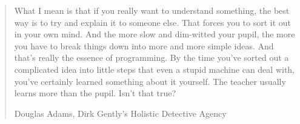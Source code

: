 \phantom{.}
\vspace{4in}

\begin{singlespace}
\begin{quote}
  What I mean is that if you really want to understand something, the best way is to try and explain it to someone else. That forces you to sort it out in your own mind. And the more slow and dim-witted your pupil, the more you have to break things down into more and more simple ideas. And that’s really the essence of programming. By the time you’ve sorted out a complicated idea into little steps that even a stupid machine can deal with, you’ve certainly learned something about it yourself. The teacher usually learns more than the pupil. Isn’t that true?

  \hfill{Douglas Adams, Dirk Gently's Holistic Detective Agency}
\end{quote}
\end{singlespace}

%
